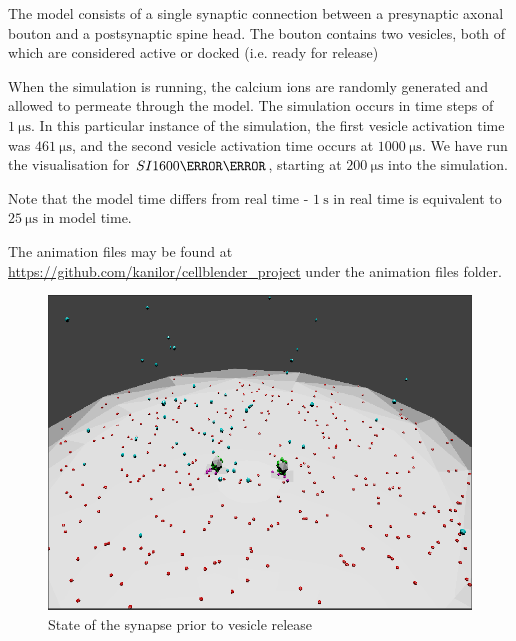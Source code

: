 \documentclass[a4paper]{article}
\begin{document}
The model consists of a single synaptic connection between a presynaptic axonal bouton and a postsynaptic spine head. The bouton contains two vesicles, both of which are considered active or docked (i.e. ready for release)

When the simulation is running, the calcium ions are randomly generated and allowed to permeate through the model. The simulation occurs in time steps of $\SI{1}{\micro\second}$. In this particular instance of the simulation, the first vesicle activation time was $\SI{461}{\micro\second}$, and the second vesicle activation time occurs at $\SI{1000}{\micro\second}$. We have run the visualisation for $SI{1600}{\micro\second}$, starting at $\SI{200}{\micro\second}$ into the simulation. 

Note that the model time differs from real time - $\SI{1}{\second}$ in real time is equivalent to $\SI{25}{\micro\second}$ in model time.

The animation files may be found at \url{https://github.com/kanilor/cellblender_project} under the animation files folder.

\begin{figure}[H]
   \centering
   \includegraphics[scale = 0.4]{fig1.png} %
   \caption{State of the synapse prior to vesicle release}
   \label{fig1}
\end{figure}
\end{document}
